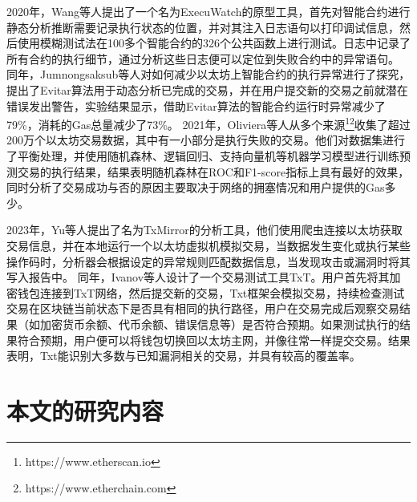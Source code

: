 2020年，Wang等人提出了一个名为ExecuWatch\cite{wang2020onthe}的原型工具，首先对智能合约进行静态分析推断需要记录执行状态的位置，并对其注入日志语句以打印调试信息，然后使用模糊测试法在100多个智能合约的326个公共函数上进行测试。日志中记录了所有合约的执行细节，通过分析这些日志便可以定位到失败合约中的异常语句。
同年，Jumnongsaksub等人\cite{reducing2020}对如何减少以太坊上智能合约的执行异常进行了探究，提出了Evitar算法用于动态分析已完成的交易，并在用户提交新的交易之前就潜在错误发出警告，实验结果显示，借助Evitar算法的智能合约运行时异常减少了79\%，消耗的Gas总量减少了73\%。
2021年，Oliviera等人\cite{oliveira_analyzing_2021}从多个来源\footnote{https://www.etherscan.io}\footnote{https://www.etherchain.com}收集了超过200万个以太坊交易数据，其中有一小部分是执行失败的交易。他们对数据集进行了平衡处理，并使用随机森林、逻辑回归、支持向量机等机器学习模型进行训练预测交易的执行结果，结果表明随机森林在ROC和F1-score指标上具有最好的效果，同时分析了交易成功与否的原因主要取决于网络的拥塞情况和用户提供的Gas多少。

2023年，Yu等人提出了名为TxMirror的分析工具\cite{Yu_2023}，他们使用爬虫连接以太坊获取交易信息，并在本地运行一个以太坊虚拟机模拟交易，当数据发生变化或执行某些操作码时，分析器会根据设定的异常规则匹配数据信息，当发现攻击或漏洞时将其写入报告中。
同年，Ivanov等人设计了一个交易测试工具TxT\cite{IvanovTxT}。用户首先将其加密钱包连接到TxT网络，然后提交新的交易，Txt框架会模拟交易，持续检查测试交易在区块链当前状态下是否具有相同的执行路径，用户在交易完成后观察交易结果（如加密货币余额、代币余额、错误信息等）是否符合预期。如果测试执行的结果符合预期，用户便可以将钱包切换回以太坊主网，并像往常一样提交交易。结果表明，Txt能识别大多数与已知漏洞相关的交易，并具有较高的覆盖率。


\section{本文的研究内容}
\label{sec:本文的研究内容}

